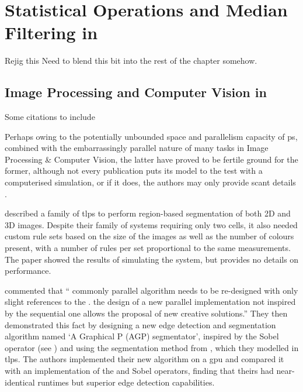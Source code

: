 \newcommand{\hopac}{Hopac}
\chapter{\label{chap:median}Statistical Operations and Median Filtering in }





\begin{anfxerror}{Rejig this}
Need to blend this bit into the rest of the chapter somehow.
\end{anfxerror}

\section{\label{subsec:imgprocpsys}Image Processing and Computer Vision in }
\begin{anfxwarning}{Some citations to include}
\cite{Zhang2012,Yuan2019}
\end{anfxwarning}

Perhaps owing to the potentially unbounded space and parallelism capacity of \gls{ps}, combined with the embarrassingly parallel nature of many tasks in Image Processing \& Computer Vision, the latter have proved to be fertile ground for the former, although not every publication puts its model to the test with a computerised simulation, or if it does, the authors may only provide scant details \cite{Diaz-Pernil2019}.

\citeauthor{Christinal2011} \cite{Christinal2011} described a family of \gls{tlps} to perform region-based segmentation of both 2D and 3D images.  Despite their family of systems requiring only two cells, it also needed custom rule sets based on the size of the images as well as the number of colours present, with a number of rules per set proportional to the same measurements.  The paper showed the results of simulating the system, but provides no details on performance.

\citeauthor{Diaz-Pernil2013} \cite{Diaz-Pernil2013} commented that \enquote{\textelp{} commonly  parallel algorithm needs to be re-designed with only slight references to the .  \textelp{} the design of a new parallel implementation not inspired by the sequential one allows \textelp{} the proposal of new creative solutions.}  They then demonstrated this fact by designing a new edge detection and segmentation algorithm named `A Graphical P (AGP) segmentator', inspired by the Sobel operator (see \eg{} \cite{Nixon2012}) and using the segmentation method from \cite{Christinal2011}, which they modelled in \gls{tlps}.  The authors implemented their new algorithm on a \gls{gpu} and compared it with an implementation of the  and  Sobel operators, finding that theirs had near-identical runtimes but superior edge detection capabilities.

